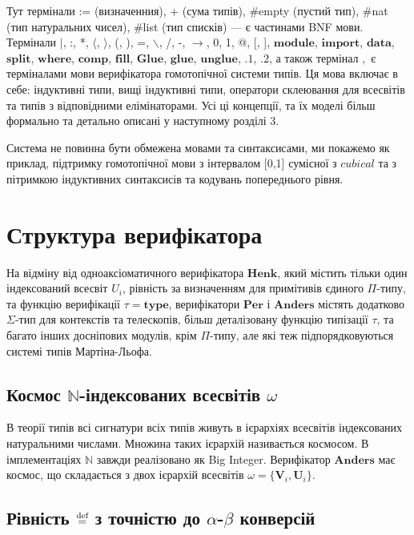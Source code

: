 Тут термінали := (визначенния), + (сума типів), \#empty (пустий тип), \#nat (тип натуральних чисел),
\#list (тип списків) --- є частинами BNF мови. Термінали
$\rvert$, :, *, $\langle$, $\rangle$, (, ), =, $\backslash$, /, -, $\rightarrow$, 0, 1, @, [, ],
$\mathbf{module}$, $\mathbf{import}$,
$\mathbf{data}$, $\mathbf{split}$, $\mathbf{where}$, $\mathbf{comp}$, $\mathbf{fill}$,
$\mathbf{Glue}$, $\mathbf{glue}$, $\mathbf{unglue}$,
$\mathbf{.1}$, $\mathbf{.2}$,
а також термінал $,$ є терміналами мови верифікатора гомотопічної системи типів.
Ця мова включає в себе: індуктивні типи, вищі індуктивні типи, оператори склеювання
для всесвітів та типів з відповідними елімінаторами. Усі ці концепції, та їх
моделі більш формально та детально описані у наступному розділі 3.

Система не повинна бути обмежена мовами та синтаксисами, ми покажемо як приклад,
підтримку гомотопічної мови з інтервалом [0,1] сумісної з $cubical$ та з пітримкою індуктивних
синтаксисів та кодувань попереднього рівня.

\section{Структура верифікатора}

На відміну від одноаксіоматичного верифікатора $\mathbf{Henk}$,
який містить тільки один індексований всесвіт $U_i$, рівність
за визначенням для примітивів єдиного $\Pi$-типу, та функцію
верифікації $\tau = \mathbf{type}$, верифікатори $\mathbf{Per}$
і $\mathbf{Anders}$ містять додатково $\Sigma$-тип для контекстів
та телескопів, більш деталізовану функцію типізації $\tau$,
та багато інших досніпових модулів, крім $\Pi$-типу, але які
теж підпорядковуються системі типів Мартіна-Льофа.

\subsection*{Космос $\mathbb{N}$-індексованих всесвітів $\omega$ }

В теорії типів всі сигнатури всіх типів живуть в ієрархіях
всесвітів індексованих натуральними числами. Множина таких
ієрархій називається космосом. В імплементаціях $\mathbb{N}$
завжди реалізовано як Big Integer. Верифікатор $\mathbf{Anders}$ має
космос, що складається з двох ієрархій всесвітів $\omega = \{ \mathbf{V}_i, \mathbf{U}_i \}$.

\subsection*{Рівність $\stackrel{\text{def}}{=}$ з точністю до $\alpha$-$\beta$ конверсій}

